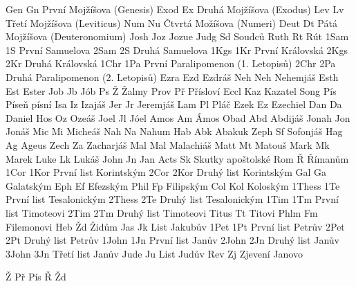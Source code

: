 \BookTitle Gen  Gn {První Mojžíšova (Genesis)}
\BookTitle Exod Ex {Druhá Mojžíšova (Exodus)}
\BookTitle Lev  Lv {Třetí Mojžíšova (Leviticus)}
\BookTitle Num  Nu {Čtvrtá Možíšova (Numeri)}
\BookTitle Deut Dt {Pátá Mojžíšova (Deuteronomium)}
\BookTitle Josh Joz {Jozue}
\BookTitle Judg Sd {Soudců}
\BookTitle Ruth Rt {Rút}
\BookTitle 1Sam 1S {První Samuelova}
\BookTitle 2Sam 2S {Druhá Samuelova}
\BookTitle 1Kgs 1Kr {První Královská}
\BookTitle 2Kgs 2Kr {Druhá Královská}
\BookTitle 1Chr 1Pa {První Paralipomenon (1. Letopisů)}
\BookTitle 2Chr 2Pa {Druhá Paralipomenon (2. Letopisů)}
\BookTitle Ezra Ezd {Ezdráš}
\BookTitle Neh  Neh {Nehemjáš}
\BookTitle Esth Est {Ester}
\BookTitle Job  Jb {Jób}
\BookTitle Ps   Ž {Žalmy}
\BookTitle Prov Př {Přísloví}
\BookTitle Eccl Kaz {Kazatel}
\BookTitle Song Pís {Píseň písní}
\BookTitle Isa  Iz {Izajáš}
\BookTitle Jer  Jr {Jeremjáš}
\BookTitle Lam  Pl {Pláč}
\BookTitle Ezek Ez {Ezechiel}
\BookTitle Dan  Da {Daniel}
\BookTitle Hos  Oz {Ozeáš}
\BookTitle Joel Jl {Jóel}
\BookTitle Amos Am {Ámos}
\BookTitle Obad Abd {Abdijáš}
\BookTitle Jonah Jon {Jonáš}
\BookTitle Mic  Mi {Micheáš}
\BookTitle Nah  Na {Nahum}
\BookTitle Hab  Abk {Abakuk}
\BookTitle Zeph Sf {Sofonjáš}
\BookTitle Hag  Ag {Ageus}
\BookTitle Zech Za {Zacharjáš}
\BookTitle Mal  Mal {Malachiáš}
\BookTitle Matt Mt {Matouš}
\BookTitle Mark Mk {Marek}
\BookTitle Luke Lk {Lukáš}
\BookTitle John Jn {Jan}
\BookTitle Acts Sk {Skutky apoštolské}
\BookTitle Rom  Ř {Římanům}
\BookTitle 1Cor 1Kor {První list Korintským}
\BookTitle 2Cor 2Kor {Druhý list Korintským}
\BookTitle Gal  Ga {Galatským}
\BookTitle Eph  Ef {Efezským}
\BookTitle Phil Fp {Filipským}
\BookTitle Col  Kol {Koloským}
\BookTitle 1Thess 1Te {První list Tesalonickým}
\BookTitle 2Thess 2Te {Druhý list Tesalonickým}
\BookTitle 1Tim 1Tm {První list Timoteovi}
\BookTitle 2Tim 2Tm {Druhý list Timoteovi}
\BookTitle Titus Tt {Titovi}
\BookTitle Phlm  Fm {Filemonovi}
\BookTitle Heb   Žd {Židům}
\BookTitle Jas   Jk {List Jakubův}
\BookTitle 1Pet  1Pt {První list Petrův}
\BookTitle 2Pet  2Pt {Druhý list Petrův}
\BookTitle 1John 1Jn {První list Janův}
\BookTitle 2John 2Jn {Druhý list Janův}
\BookTitle 3John 3Jn {Třetí list Janův}
\BookTitle Jude  Ju {List Judův}
\BookTitle Rev   Zj {Zjevení Janovo}     

\BookException Ž   {\def\amark{Z}}
\BookException Př  {\def\amark{Pr}}
\BookException Pís {\def\amark{Pis}}
\BookException Ř   {\def\amark{R}}
\BookException Žd  {\def\amark{Zd}}

\def\nochapbooks{Abd Fm 2Jn 3Jn Ju}
